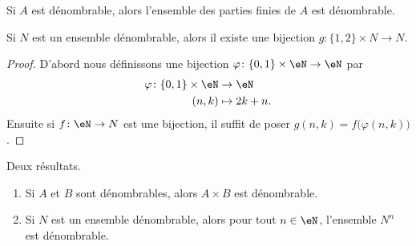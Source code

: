 \begin{lemma}		\label{LEMooKFBAooHxgOsg}
	Si \( A\) est dénombrable, alors l'ensemble des parties finies de \( A\) est dénombrable.
\end{lemma}

\begin{lemma}        \label{LEMooRXSRooBUWOyb}
	Si \( N\) est un ensemble dénombrable, alors il existe une bijection \( g\colon \{ 1,2 \}\times N\to N\).
\end{lemma}

\begin{proof}
	D'abord nous définissons une bijection \( \varphi\colon \{ 0,1 \}\times \eN\to \eN\) par
	\begin{equation}
		\begin{aligned}
			\varphi\colon \{ 0,1 \}\times \eN & \to \eN       \\
			(n,k)                             & \mapsto 2k+n.
		\end{aligned}
	\end{equation}
	Ensuite si \( f\colon \eN\to N\) est une bijection, il suffit de poser \( g(n,k)=f\big( \varphi(n,k) \big)\).
\end{proof}

\begin{proposition}     \label{PROPooDMZHooXouDrQ}
	Deux résultats.
	\begin{enumerate}
		\item		\label{ITEMooWNBGooZjoIjZ}
		      Si \( A\) et \( B\) sont dénombrables, alors \( A\times B\) est dénombrable.
		\item
		      Si \( N\) est un ensemble dénombrable, alors pour tout \( n\in \eN\), l'ensemble \( N^n\) est dénombrable.
	\end{enumerate}
\end{proposition}

